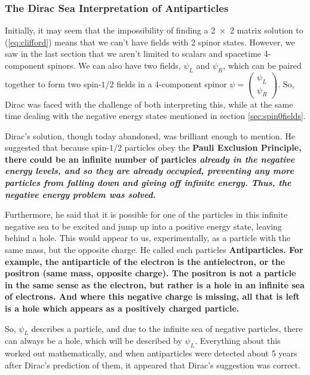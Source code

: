 \documentclass[12pt,epsf]{article}
\begin{document}
\subsubsection{The Dirac Sea Interpretation of Antiparticles}

Initially, it may seem that the impossibility of finding a 2~$\times$~2
matrix solution to (\ref{eq:clifford}) means that we can't have fields
with 2 spinor states.  However, we saw in the last section that we
aren't limited to scalars and spacetime 4-component spinors.	We can
also have two fields, $\psi_L$ and $\psi_R$, which can be paired
together to form two spin-$1/2$ fields in a 4-component spinor $\psi
= \begin{pmatrix}
\psi_L \\ \psi_R
\end{pmatrix}$.  So, Dirac was faced with the challenge of both
interpreting this, while at the same time dealing with the negative
energy states mentioned in section \ref{sec:spin0fields}.  

Dirac's solution, though today abandoned, was brilliant enough to
mention.  He suggested that because spin-$1/2$ particles obey the \bf Pauli
Exclusion Principle\rm, there could be an infinite number of particles \it
already \rm in the negative energy levels, and so they are already
occupied, preventing any more particles from falling down and giving
off infinite energy.  Thus, the negative energy problem was solved.  

Furthermore, he said that it is possible for one of the particles in
this infinite negative sea to be excited and jump up into a positive
energy state, leaving behind a hole.  This would appear to us,
experimentally, as a particle with the same mass, but the opposite
charge.  He called such particles \bf Antiparticles\rm.  For example,
the antiparticle of the electron is the antielectron, or the positron
(same mass, opposite charge).  The positron is not a particle in the
same sense as the electron, but rather is a hole in an infinite sea of
electrons.  And where this negative charge is missing, all that is left
is a hole which appears as a positively charged particle.  

So, $\psi_L$ describes a particle, and due to the infinite sea of
negative particles, there can always be a hole, which will be described
by $\psi_L$.  Everything about this worked out mathematically, and when
antiparticles were detected about 5 years after Dirac's prediction
of them, it appeared that Dirac's suggestion was correct.  
\end{document}
